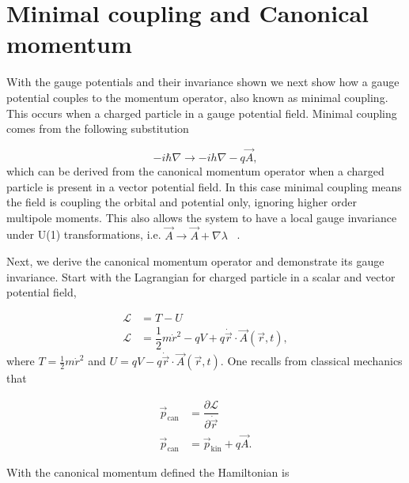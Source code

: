 \section{Minimal coupling and Canonical momentum}
With the gauge potentials and their invariance shown we next show how a gauge potential couples to the momentum operator, also known as minimal coupling.
This occurs when a charged particle in a gauge potential field.
Minimal coupling comes from the following substitution

\begin{equation}
  -i\hbar\nabla \rightarrow -ih\nabla - q\vec{A},
\end{equation}
which can be derived from the canonical momentum operator when a charged particle is present in a vector potential field.
In this case minimal coupling means the field is coupling the orbital and potential only, ignoring higher order multipole moments.
This also allows the system to have a local gauge invariance under U(1) transformations, i.e.
$\vec{A} \rightarrow \vec{A} + \nabla\lambda$  ~\cite{altlandCondensedMatterField2023}.

Next, we derive the canonical momentum operator and demonstrate its gauge invariance.
Start with the Lagrangian for charged particle in a scalar and vector potential field,

\begin{align}
  \mathcal{L} &= T- U \nonumber \\
  \mathcal{L} &= \dfrac{1}{2} m \dot{r}^2 - qV + q \dot{\vec{r}} \cdot \vec{A}(\vec{r},t),
\end{align}
where $T = \tfrac{1}{2} m \dot{r}^2$ and $U = qV - q \dot{\vec{r}} \cdot \vec{A}(\vec{r},t)$.
One recalls from classical mechanics that

\begin{align}
  \vec{p}_{\text{can}} &= \dfrac{\partial\mathcal{L}}{\partial \dot{\vec{r}}} \nonumber \\
  \vec{p}_{\text{can}} &= \vec{p}_{\text{kin}} + q \vec{A}.
  \label{eq:canonical-momentum}
\end{align}

With the canonical momentum defined the Hamiltonian is

